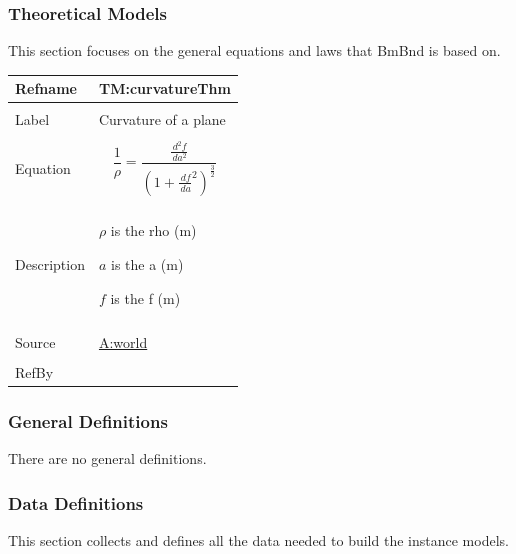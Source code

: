 \documentclass[12pt]{article}
\begin{document}
\subsubsection{Theoretical Models}
\label{Sec:TMs}
This section focuses on the general equations and laws that BmBnd is based on.

\vspace{\baselineskip}
\noindent
\begin{minipage}{\textwidth}
\begin{tabular}{>{\raggedright}p{}>{\raggedright\arraybackslash}p{}}
\toprule \textbf{Refname} & \textbf{TM:curvatureThm}
\label{TM:curvatureThm}
\\ \midrule \\
Label & Curvature of a plane
        
\\ \midrule \\
Equation & \begin{displaymath}
           \frac{1}{ρ}=\frac{\frac{\,d^{2}f}{\,da^{2}}}{\left(1+\frac{\,df}{\,da}^{2}\right)^{\frac{3}{2}}}
           \end{displaymath}
\\ \midrule \\
Description & \begin{symbDescription}
              \item{$ρ$ is the rho (${\text{m}}$)}
              \item{$a$ is the a (${\text{m}}$)}
              \item{$f$ is the f (${\text{m}}$)}
              \end{symbDescription}
\\ \midrule \\
Source & \hyperref[world]{A:world}
         
\\ \midrule \\
RefBy & 
\\ \bottomrule
\end{tabular}
\end{minipage}
\subsubsection{General Definitions}
\label{Sec:GDs}
There are no general definitions.

\subsubsection{Data Definitions}
\label{Sec:DDs}
This section collects and defines all the data needed to build the instance models.
\end{document}
